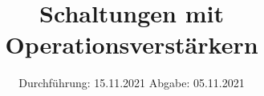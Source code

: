 
\setlength\parindent{0pt}
\subject{V51}
\title{Schaltungen mit Operationsverstärkern}
\date{%
  Durchführung: 15.11.2021
  \hspace{3em}
  Abgabe: 05.11.2021 \\
}



\maketitle
\thispagestyle{empty}
\tableofcontents
\newpage







\newpage
\nocite{*}
\printbibliography


